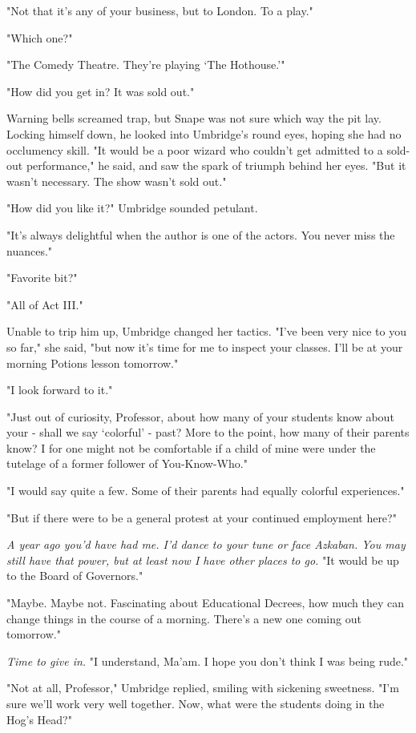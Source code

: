 "Not that it's any of your business, but to London. To a play."

"Which one?"

"The Comedy Theatre. They're playing `The Hothouse.'"

"How did you get in? It was sold out."

Warning bells screamed trap, but Snape was not sure which way the pit lay. Locking himself down, he looked into Umbridge's round eyes, hoping she had no occlumency skill. "It would be a poor wizard who couldn't get admitted to a sold-out performance," he said, and saw the spark of triumph behind her eyes. "But it wasn't necessary. The show wasn't sold out."

"How did you like it?" Umbridge sounded petulant.

"It's always delightful when the author is one of the actors. You never miss the nuances."

"Favorite bit?"

"All of Act III."

Unable to trip him up, Umbridge changed her tactics. "I've been very nice to you so far," she said, "but now it's time for me to inspect your classes. I'll be at your morning Potions lesson tomorrow."

"I look forward to it."

"Just out of curiosity, Professor, about how many of your students know about your - shall we say `colorful' - past? More to the point, how many of their parents know? I for one might not be comfortable if a child of mine were under the tutelage of a former follower of You-Know-Who."

"I would say quite a few. Some of their parents had equally colorful experiences."

"But if there were to be a general protest at your continued employment here?"

\emph{A year ago you'd have had me. I'd dance to your tune or face Azkaban. You may still have that power, but at least now I have other places to go.} "It would be up to the Board of Governors."

"Maybe. Maybe not. Fascinating about Educational Decrees, how much they can change things in the course of a morning. There's a new one coming out tomorrow."

\emph{Time to give in.} "I understand, Ma'am. I hope you don't think I was being rude."

"Not at all, Professor," Umbridge replied, smiling with sickening sweetness. "I'm sure we'll work very well together. Now, what were the students doing in the Hog's Head?"

